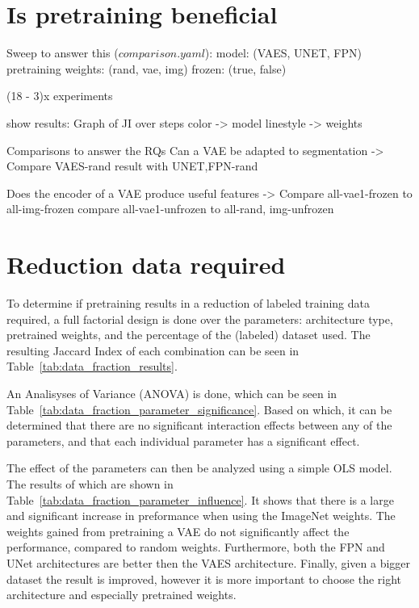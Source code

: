 \section{Is pretraining beneficial}

Sweep to answer this ($comparison.yaml$):
model: (VAES, UNET, FPN)
pretraining weights: (rand, vae, img)
frozen: (true, false)

(18 - 3)x experiments

show results:
Graph of JI over steps
color -> model
linestyle -> weights

Comparisons to answer the RQs
Can a VAE be adapted to segmentation 
->
Compare VAES-rand result with {UNET,FPN}-rand

Does the encoder of a VAE produce useful features
->
Compare {all}-vae1-frozen to {all}-img-frozen
compare {all}-vae1-unfrozen to {all}-{rand, img}-unfrozen


\section{Reduction data required}
To determine if pretraining results in a reduction of labeled training data required, a full factorial design is done over the parameters: architecture type, pretrained weights, and the percentage of the (labeled) dataset used. The resulting Jaccard Index of each combination can be seen in Table~\ref{tab:data_fraction_results}.


An Analisyses of Variance (ANOVA) is done, which can be seen in Table~\ref{tab:data_fraction_parameter_significance}. Based on which, it can be determined that there are no significant interaction effects between any of the parameters, and that each individual parameter has a significant effect.


The effect of the parameters can then be analyzed using a simple OLS model. The results of which are shown in Table~\ref{tab:data_fraction_parameter_influence}. It shows that there is a large and significant increase in preformance when using the ImageNet weights. The weights gained from pretraining a VAE do not significantly affect the performance, compared to random weights. Furthermore, both the FPN and UNet architectures are better then the VAES architecture. Finally, given a bigger dataset the result is improved, however it is more important to choose the right architecture and especially pretrained weights.





